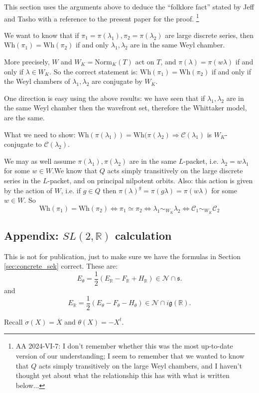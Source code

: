 \documentclass[10pt,leqno]{article}
\newcommand{\Norm}{\mathrm{Norm}}
\newcommand{\R}{\mathbb R}
\newcommand{\N}{\mathcal N}
\newcommand{\g}{\mathfrak g}
\newcommand{\s}{\mathfrak s}
\newcommand{\Wh}{\mathrm{Wh}}
\begin{document}
This section uses the arguments above to deduce the ``folklore fact'' stated by  Jeff and Tasho with a reference to the present paper for the proof. \footnote{AA 2024-VI-7: I don't remember whether this was the most up-to-date version  of our understanding; I seem to remember that we wanted to know that $Q$ acts simply transitively on the large Weyl chambers, and I haven't thought yet about what the relationship this has with what is written below...}


We want to know that if $\pi_1=\pi(\lambda_1),\pi_2=\pi(\lambda_2)$ are large discrete series, then $\Wh(\pi_1)=\Wh(\pi_2)$ if and only $\lambda_1,\lambda_2$
are in the same Weyl chamber.

More precisely, $W$ and $W_K=\Norm_K(T)$ act on $T$, and $\pi(\lambda)=\pi(w\lambda)$ if and only if $\lambda\in W_K$.
So the correct statement is: $\Wh(\pi_1)=\Wh(\pi_2)$ if and only if the Weyl chambers of $\lambda_1,\lambda_2$ are conjugate by $W_K$.

One direction is easy using the above results: we have seen that if $\lambda_1,\lambda_2$
are in the same Weyl chamber then the wavefront set, therefore the Whittaker model, are the same. 

What we need to show:
$\Wh(\pi(\lambda_1))=\Wh(\pi(\lambda_2)\Rightarrow \mathcal C(\lambda_1)$ is $W_K$-conjugate to  $\mathcal C(\lambda_2)$.

We may as well assume $\pi(\lambda_1),\pi(\lambda_2)$ are in the same $L$-packet, i.e. $\lambda_2=w\lambda_1$ for some $w\in W$.We know that $Q$ acts simply transitively on the large discrete series in the $L$-packet, and on principal nilpotent orbits.
Also: this action is given by the action of $W$, i.e. if $g\in Q$ then $\pi(\lambda)^g=\pi(g\lambda)=\pi(w\lambda)$ for some $w\in W$.
So
$$
\Wh(\pi_1)=\Wh(\pi_2)\Leftrightarrow \pi_1\simeq \pi_2\Leftrightarrow \lambda_1\sim_{W_K}\lambda_2\Leftrightarrow \mathcal C_1\sim_{W_K}\mathcal C_2
$$

\subsection{Appendix: $SL(2,\R)$ calculation}

This is not for publication, just to make sure we have the formulas in Section \ref{sec:concrete_sek} correct.
These are:
$$
E_\theta=\frac12(E_\R-F_\R+H_\R)\in \N\cap \s.
$$
and
$$
E_\R=\frac 12(E_\theta-F_\theta-H_\theta)\in\N\cap i\g(\R).
$$

Recall $\sigma(X)=\overline X$ and $\theta(X)=-X^t$.
\end{document}
